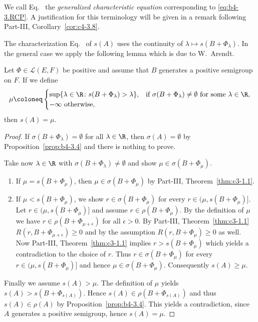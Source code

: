 \begin{remark*}
	We call Eq.~ the \emph{generalized characteristic equation} corresponding to \eqref{eq:b4-3.RCP}. 
	A justification for this terminology will be given in a remark following Part-III, Corollary~\ref{cor:c4-3.8}.
\end{remark*}
The characterization Eq.~ of\/ $s(A)$ uses the continuity of\/ $\lambda \mapsto s(B + \Phi_{\lambda})$. 
In the general case we apply the following lemma which is due to W.~Arendt.
\begin{lemma*} 
	Let  $\Phi \in \mathcal{L}(E,F)$  be positive and assume that  $B$ generates a positive semigroup on  $F$. 
	If we define
	\[
	\mu \coloneq 
	\begin{cases}
		\sup\{\lambda \in \R \colon s(B+\Phi_{\lambda}) > \lambda\},  & \text{if } \sigma(B+\Phi_{\lambda}) \neq \emptyset \text{ for some } \lambda \in \R, \\
		-\infty   \text{ otherwise}, &
	\end{cases}
	\]
	then  $s(A) = \mu$.
\end{lemma*}	
\begin{proof}
If\/ $\sigma(B+\Phi_{\lambda}) = \emptyset$ for all $\lambda \in \R$, then $\sigma(A) = \emptyset$ by Proposition~\ref{prop:b4-3.4} and there is nothing to prove.

Take now $\lambda \in \R$ with $\sigma(B+\Phi_{\lambda}) \neq \emptyset$ and show $\mu \in \sigma(B+\Phi_{\mu})$.
\begin{enumerate}[label={Case~\arabic*: }, wide, labelindent=0em]
\item 
If\/ $\mu = s(B+\Phi_{\mu})$, then $\mu \in \sigma(B+\Phi_{\mu})$ by Part-III, Theorem~\ref{thm:c3-1.1}.

\item 
If\/ $\mu < s(B+\Phi_{\mu})$, we show $r \in \sigma(B+\Phi_{\mu})$ for every $r \in (\mu,s(B+\Phi_{\mu})]$.
Let $r \in (\mu,s(B+\Phi_{\mu})]$ and assume $r \in \rho(B+\Phi_{\mu})$. 
By the definition of\/ $\mu$ we have $r \in \rho(B+\Phi_{\mu+\epsilon})$ for all $\epsilon > 0$. 
By Part-III, Theorem~\ref{thm:c3-1.1} $R(r,B+\Phi_{\mu+\epsilon}) \geq 0$ and by the assumption $R(r,B+\Phi_{\mu}) \geq 0$ as well. 
Now Part-III, Theorem~\ref{thm:c3-1.1} implies $r > s(B+\Phi_{\mu})$ which yields a contradiction to the choice of\/ $r$. 
Thus $r \in \sigma(B+\Phi_{\mu})$ for every $r \in (\mu,s(B+\Phi_{\mu})]$ and hence $\mu \in \sigma(B+\Phi_{\mu})$. 
Consequently $s(A) \geq \mu$.
\end{enumerate}
Finally we assume $s(A) > \mu$. 
The definition of\/ $\mu$ yields $s(A) > s(B+\Phi_{s(A)})$. 
Hence $s(A) \in \rho(B+\Phi_{s(A)})$ and thus $s(A) \in \rho(A)$ by Proposition~\ref{prop:b4-3.4}. 
This yields a contradiction, since $A$ generates a positive semigroup, hence $s(A) = \mu$.
\end{proof}
